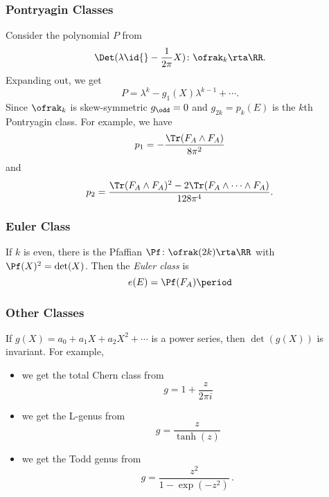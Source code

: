 
\subsubsection{Pontryagin Classes}
\label{pontrjagin}
Consider the polynomial $P$ from 
\[
	\Det(\lambda\id{}-\frac{1}{2\pi}X)\colon\ofrak_k\rta\RR.
\]
Expanding out, we get
\[
	P=\lambda^k-g_1(X)\lambda^{k-1}+\cdots.
\]
Since $\ofrak_k$ is skew-symmetric $g_{\odd}=0$ and $g_{2k}=p_k(E)$ is the $k$th Pontryagin class. 
For example, we have
\[
	p_1=-\frac{\Tr(F_A\wedge F_A)}{8\pi^2}
\]
and
\[
	p_2=\frac{\Tr(F_A\wedge F_A)^2-2\Tr(F_A\wedge\cdots\wedge F_A)}{128\pi^4}.
\]


\subsubsection{Euler Class}
\label{euler_const}

If $k$ is even, there is the Pfaffian $\Pf\colon\ofrak(2k)\rta\RR$ with $\Pf(X)^2=\det(X)$. Then the \emph{Euler class} is 
\[e(E)=\Pf(F_A)\period\]


\subsubsection{Other Classes}

If $g(X)=a_0+a_1X+a_2X^2+\cdots$ is a power series, then $\det(g(X))$ is invariant. For example,
\begin{itemize}
\item we get the total Chern class from
\[g=1+\frac{z}{2\pi i}\]
\item we get the L-genus from
\[g=\frac{z}{\tanh(z)}\]
\item we get the Todd genus from
\[g=\frac{z^2}{1-\exp(-z^2)}\period\]
\end{itemize}

